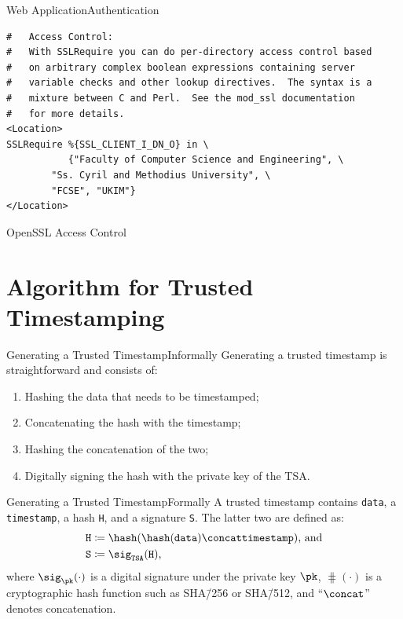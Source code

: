 \documentclass[xcolor={svgnames, table}, usepdftitle=false]{beamer}
\begin{document}
\begin{frame}[fragile]{Web Application}{Authentication}
\begin{listing}[H]
\centering
\begin{verbatim}
#   Access Control:
#   With SSLRequire you can do per-directory access control based
#   on arbitrary complex boolean expressions containing server
#   variable checks and other lookup directives.  The syntax is a
#   mixture between C and Perl.  See the mod_ssl documentation
#   for more details.
<Location>
SSLRequire %{SSL_CLIENT_I_DN_O} in \
           {"Faculty of Computer Science and Engineering", \
	    "Ss. Cyril and Methodius University", \
	    "FCSE", "UKIM"}
</Location>
\end{verbatim}
\caption{OpenSSL Access Control}\label{lst:authentication}
\end{listing}
\end{frame}

\section{Algorithm for Trusted Timestamping}

\begin{frame}{Generating a Trusted Timestamp}{Informally}
  Generating a trusted timestamp is straightforward and consists of:
  \begin{enumerate}
  \item Hashing the data that needs to be timestamped;
  \item Concatenating the hash with the timestamp;
  \item Hashing the concatenation of the two;
  \item Digitally signing the hash with the private key of the TSA.\@
  \end{enumerate}
\end{frame}

\begin{frame}{Generating a Trusted Timestamp}{Formally}
  A trusted timestamp contains \texttt{data}, a \texttt{timestamp}, a
  hash \texttt{H}, and a signature \texttt{S}.  The latter two are defined as:
  \begin{equation}
    \begin{aligned}
      \mathtt{H} &\coloneqq \hash(\hash(\mathtt{data}) \concat \mathtt{timestamp})\text{, and} \\
      \mathtt{S} &\coloneqq \sig_{\mathtt{TSA}}(\mathtt{H})\text,
    \end{aligned}
  \end{equation}
  where \(\sig_{\pk}(\cdot)\) is a digital signature under the private
  key \(\pk\), \(\hash(\cdot)\) is a cryptographic hash function such
  as SHA\=/\num{256} or SHA\=/\num{512}, and \enquote{\(\concat\)}
  denotes concatenation.
\end{frame}
\end{document}

